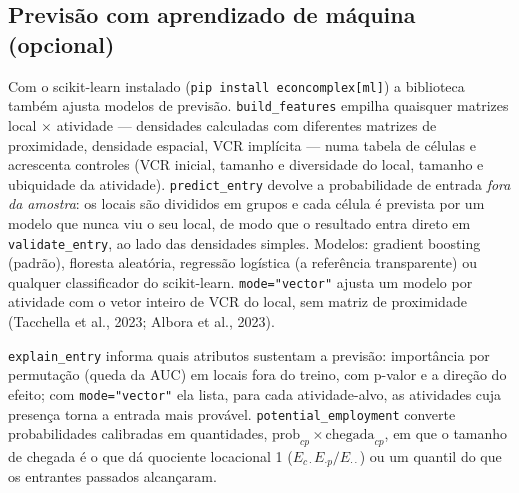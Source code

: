 \documentclass[12pt, a4paper]{article}
\newcommand{\fn}[1]{\texttt{#1}}
\begin{document}
\subsection{Previs\~{a}o com aprendizado de m\'{a}quina (opcional)}

\begin{sloppypar}
Com o scikit-learn instalado (\texttt{pip install econcomplex[ml]}) a
biblioteca tamb\'{e}m ajusta modelos de previs\~{a}o. \fn{build\_features}
empilha quaisquer matrizes local $\times$ atividade --- densidades
calculadas com diferentes matrizes de proximidade, densidade espacial,
VCR impl\'{i}cita --- numa tabela de c\'{e}lulas e acrescenta controles (VCR
inicial, tamanho e diversidade do local, tamanho e ubiquidade da
atividade). \fn{predict\_entry} devolve a probabilidade de entrada
\emph{fora da amostra}: os locais s\~{a}o divididos em grupos e cada
c\'{e}lula \'{e} prevista por um modelo que nunca viu o seu local, de modo
que o resultado entra direto em \fn{validate\_entry}, ao lado das
densidades simples. Modelos: gradient boosting (padr\~{a}o), floresta
aleat\'{o}ria, regress\~{a}o log\'{i}stica (a refer\^{e}ncia transparente) ou
qualquer classificador do scikit-learn. \texttt{mode="vector"} ajusta um
modelo por atividade com o vetor inteiro de VCR do local, sem matriz de
proximidade (Tacchella et al., 2023; Albora et al., 2023).
\end{sloppypar}

\begin{sloppypar}
\fn{explain\_entry} informa quais atributos sustentam a previs\~{a}o:
import\^{a}ncia por permuta\c{c}\~{a}o (queda da AUC) em locais fora do
treino, com p-valor e a dire\c{c}\~{a}o do efeito; com
\texttt{mode="vector"} ela lista, para cada atividade-alvo, as
atividades cuja presen\c{c}a torna a entrada mais prov\'{a}vel. \fn{potential\_employment} converte probabilidades
calibradas em quantidades,
$\text{prob}_{cp} \times \text{chegada}_{cp}$, em que o tamanho de chegada
\'{e} o que d\'{a} quociente locacional 1
($E_{c\cdot}E_{\cdot p}/E_{\cdot\cdot}$) ou um quantil do que os entrantes
passados alcan\c{c}aram.
\end{sloppypar}
\end{document}
